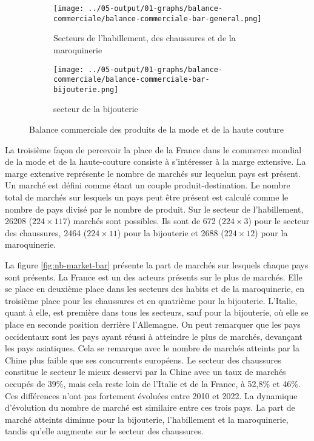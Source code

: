 \documentclass[french,10pt,a4paper]{article}
\begin{document}
\begin{figure}[!h]
  \centering
  \begin{subfigure}{\textwidth}
    \centering     \texttt{[image: ../05-output/01-graphs/balance-commerciale/balance-commerciale-bar-general.png]}
    \caption{Secteurs de l'habillement, des chaussures et de la maroquinerie}
    \label{fig:balance-commerciale-bar-general}
  \end{subfigure}
  \vspace{0.5cm}
  \begin{subfigure}{\textwidth}
    \centering \texttt{[image: ../05-output/01-graphs/balance-commerciale/balance-commerciale-bar-bijouterie.png]}
 \caption{secteur de la bijouterie}
 \label{fig:balance-commerciale-bar-bijouterie}
  \end{subfigure}
  \caption{Balance commerciale des produits de la mode et de la haute couture}
  \label{fig:balance-commerciale}
\end{figure}


La troisième façon de percevoir la place de la France dans le commerce mondial de la mode et de la haute-couture consiste à s'intéresser à la marge extensive. La marge extensive représente le nombre de marchés sur lequelun pays est présent. Un marché est défini comme étant un couple produit-destination. Le nombre total de marchés sur lesquels un pays peut être présent est calculé comme le nombre de pays divisé par le nombre de produit. Sur le secteur de l'habillement, 26208 ($224 \times 117$) marchés sont possibles. Ils sont de 672 ($224 \times 3$) pour le secteur des chaussures, 2464 ($224 \times 11$) pour la bijouterie et 2688 ($224 \times 12$) pour la maroquinerie.

La figure \ref{fig:nb-market-bar} présente la part de marchés sur lesquels chaque pays sont présents. La France est un des acteurs présents sur le plus de marchés. Elle se place en deuxième place dans les secteurs des habits et de la maroquinerie, en troisième place pour les chaussures et en quatrième pour la bijouterie. L'Italie, quant à elle, est première dans tous les secteurs, sauf pour la bijouterie, où elle se place en seconde position derrière l'Allemagne. On peut remarquer que les pays occidentaux sont les pays ayant réussi à atteindre le plus de marchés, devançant les pays asiatiques. Cela se remarque avec le nombre de marchés atteints par la Chine plus faible que ses concurrents européens. Le secteur des chaussures constitue le secteur le mieux desservi par la Chine avec un taux de marchés occupés de 39\%, mais cela reste loin de l'Italie et de la France, à 52,8\% et 46\%. Ces différences n'ont pas fortement évoluées entre 2010 et 2022. La dynamique d'évolution du nombre de marché est similaire entre ces trois pays. La part de marché atteints diminue pour la bijouterie, l'habillement et la maroquinerie, tandis qu'elle augmente sur le secteur des chaussures.
\end{document}
